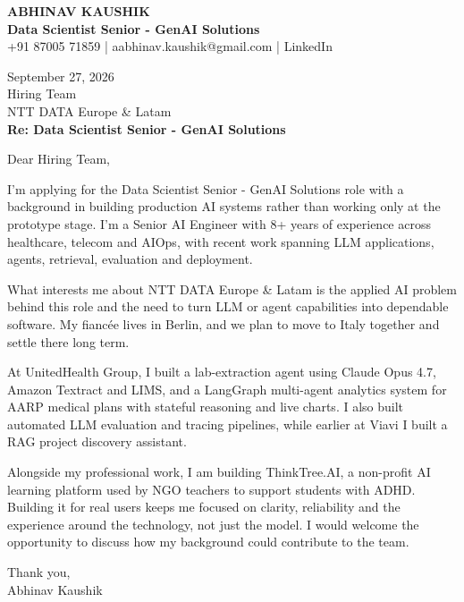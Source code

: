 \documentclass[10pt,a4paper]{article}
\begin{document}
\begin{center}
{\Large\bfseries ABHINAV KAUSHIK}\\[2pt]
{\bfseries Data Scientist Senior - GenAI Solutions}\\[2pt]
+91 87005 71859 \quad | \quad aabhinav.kaushik@gmail.com \quad | \quad LinkedIn
\end{center}
\vspace{8pt}
September 27, 2026\\[6pt]
Hiring Team\\
NTT DATA Europe \& Latam\\[4pt]
\textbf{Re: Data Scientist Senior - GenAI Solutions}

Dear Hiring Team,

I’m applying for the Data Scientist Senior - GenAI Solutions role with a background in building production AI systems rather than working only at the prototype stage. I’m a Senior AI Engineer with 8+ years of experience across healthcare, telecom and AIOps, with recent work spanning LLM applications, agents, retrieval, evaluation and deployment.

What interests me about NTT DATA Europe \& Latam is the applied AI problem behind this role and the need to turn LLM or agent capabilities into dependable software. My fiancée lives in Berlin, and we plan to move to Italy together and settle there long term.

At UnitedHealth Group, I built a lab-extraction agent using Claude Opus 4.7, Amazon Textract and LIMS, and a LangGraph multi-agent analytics system for AARP medical plans with stateful reasoning and live charts. I also built automated LLM evaluation and tracing pipelines, while earlier at Viavi I built a RAG project discovery assistant.

Alongside my professional work, I am building ThinkTree.AI, a non-profit AI learning platform used by NGO teachers to support students with ADHD. Building it for real users keeps me focused on clarity, reliability and the experience around the technology, not just the model. I would welcome the opportunity to discuss how my background could contribute to the team.

Thank you,\\
Abhinav Kaushik
\end{document}
